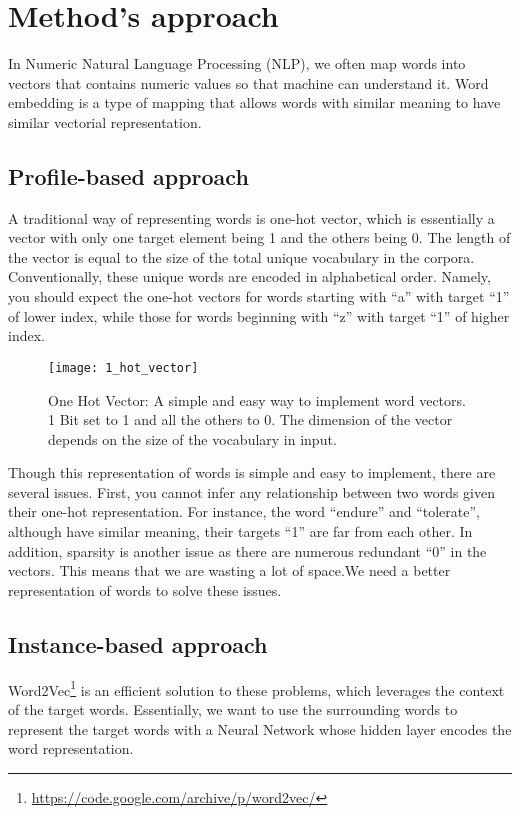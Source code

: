 \section{Method's approach}

In Numeric Natural Language Processing (NLP), we often map words into vectors that contains numeric values so that machine can understand it. Word embedding is a type of mapping that allows words with similar meaning to have similar vectorial representation.

\subsection{Profile-based approach}

A traditional way of representing words is one-hot vector, which is essentially a vector with only one target element being 1 and the others being 0. The length of the vector is equal to the size of the total unique vocabulary in the corpora. Conventionally, these unique words are encoded in alphabetical order. Namely, you should expect the one-hot vectors for words starting with “a” with target “1” of lower index, while those for words beginning with “z” with target “1” of higher index.


\begin{figure}[ht]
    \centering
    \texttt{[image: 1\_hot\_vector]}
    \caption[One Hot vector]{One Hot Vector: A simple and easy way to implement word vectors. 1 Bit set to 1 and all the others to 0. The dimension of the vector depends on the size of the vocabulary in input.}
    \label{fig:1_hot_vector}
\end{figure}

Though this representation of words is simple and easy to implement, there are several issues. First, you cannot infer any relationship between two words given their one-hot representation. For instance, the word “endure” and “tolerate”, although have similar meaning, their targets “1” are far from each other. In addition, sparsity is another issue as there are numerous redundant “0” in the vectors. This means that we are wasting a lot of space.We need a better representation of words to solve these issues.

\subsection{Instance-based approach}

Word2Vec\footnote{\url{https://code.google.com/archive/p/word2vec/}} is an efficient solution to these problems, which leverages the context of the target words. Essentially, we want to use the surrounding words to represent the target words with a Neural Network whose hidden layer encodes the word representation.

